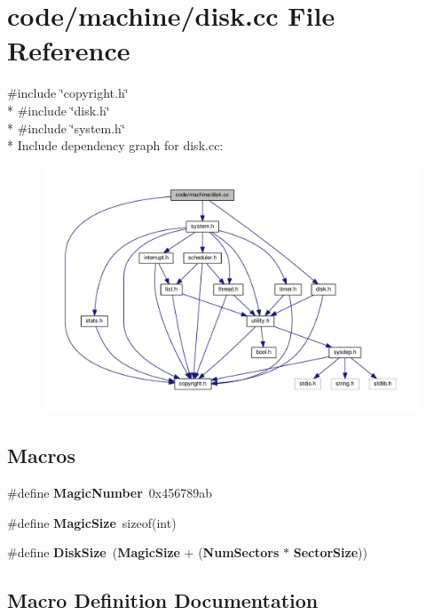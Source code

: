 \section{code/machine/disk.cc File Reference}
\label{disk_8cc}
{\ttfamily \#include \char`\"{}copyright.\+h\char`\"{}}\\*
{\ttfamily \#include \char`\"{}disk.\+h\char`\"{}}\\*
{\ttfamily \#include \char`\"{}system.\+h\char`\"{}}\\*
Include dependency graph for disk.\+cc\+:
\nopagebreak
\begin{figure}[H]
\begin{center}
\leavevmode
\includegraphics[width=350pt]{disk_8cc__incl}
\end{center}
\end{figure}
\subsection*{Macros}
\begin{DoxyCompactItemize}
\item 
\#define {\bf Magic\+Number}~0x456789ab
\item 
\#define {\bf Magic\+Size}~sizeof(int)
\item 
\#define {\bf Disk\+Size}~({\bf Magic\+Size} + ({\bf Num\+Sectors} $\ast$ {\bf Sector\+Size}))
\end{DoxyCompactItemize}


\subsection{Macro Definition Documentation}
